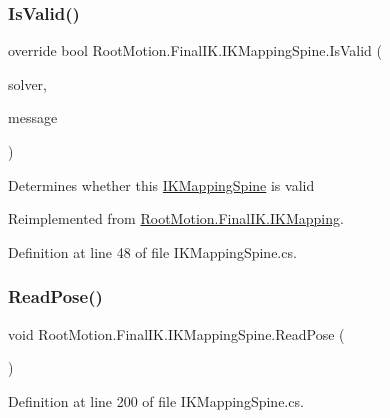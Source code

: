 \subsubsection{\texorpdfstring{Is\+Valid()}{IsValid()}}
{\footnotesize\ttfamily override bool Root\+Motion.\+Final\+I\+K.\+I\+K\+Mapping\+Spine.\+Is\+Valid (\begin{DoxyParamCaption}\item[{\mbox{\hyperlink{class_root_motion_1_1_final_i_k_1_1_i_k_solver}{I\+K\+Solver}}}]{solver,  }\item[{ref string}]{message }\end{DoxyParamCaption})\hspace{0.3cm}{\ttfamily [virtual]}}



Determines whether this \mbox{\hyperlink{class_root_motion_1_1_final_i_k_1_1_i_k_mapping_spine}{I\+K\+Mapping\+Spine}} is valid 



Reimplemented from \mbox{\hyperlink{class_root_motion_1_1_final_i_k_1_1_i_k_mapping_a4a81f9083afd318e2578de48fa914870}{Root\+Motion.\+Final\+I\+K.\+I\+K\+Mapping}}.



Definition at line 48 of file I\+K\+Mapping\+Spine.\+cs.

\mbox{\label{class_root_motion_1_1_final_i_k_1_1_i_k_mapping_spine_aa1eb8c101603c5e6340acab5bc639673}} 
\subsubsection{\texorpdfstring{Read\+Pose()}{ReadPose()}}
{\footnotesize\ttfamily void Root\+Motion.\+Final\+I\+K.\+I\+K\+Mapping\+Spine.\+Read\+Pose (\begin{DoxyParamCaption}{ }\end{DoxyParamCaption})}



Definition at line 200 of file I\+K\+Mapping\+Spine.\+cs.

\mbox{\label{class_root_motion_1_1_final_i_k_1_1_i_k_mapping_spine_aefe05c1be4d51067c2165e450f300c1f}} 
